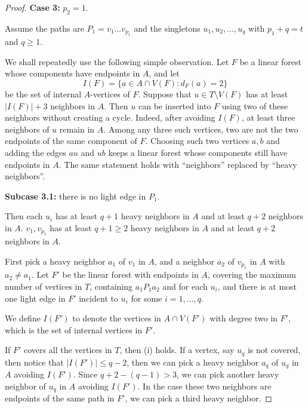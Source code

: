 \documentclass[12pt]{article}
\begin{document}
\begin{proof}
    \noindent
    \textbf{Case 3:} $p_2 = 1$.
    
    Assume the paths are $P_1=v_1 \ldots v_{p_1}$ and the singletons $u_1, u_2,\ldots, u_q$ with $p_1 + q = t$ and $q\geq 1$.

    We shall repeatedly use the following simple observation. Let $F$ be a
linear forest whose components have endpoints in $A$, and let
$$
I(F)=\{a\in A\cap V(F): d_F(a)=2\}
$$
be the set of internal $A$-vertices of $F$. Suppose that
$u\in T\setminus V(F)$ has at least $|I(F)|+3$ neighbors in $A$.
Then $u$ can be inserted into $F$ using two of these neighbors without
creating a cycle. Indeed, after avoiding $I(F)$, at least three neighbors
of $u$ remain in $A$. Among any three such vertices, two are not the two
endpoints of the same component of $F$. Choosing such two vertices $a,b$
and adding the edges $au$ and $ub$ keeps a linear forest whose components
still have endpoints in $A$. The same statement holds with ``neighbors''
replaced by ``heavy neighbors''.

    \textbf{Subcase 3.1:} there is no light edge in $P_1$.
    
    Then each $u_i$ has at least $q+1$ heavy neighbors in $A$ and at least $q+2$ neighbors in $A$.
    $v_1, v_{p_1}$ has at least $q+1\geq 2$ heavy neighbors in $A$ and at least $q+2$ neighbors in $A$.

    First pick a heavy neighbor $a_1$ of $v_1$ in $A$, and a neighbor $a_2$ of $v_{p_1}$ in $A$ with $a_2 \neq a_1$.
    Let $F'$ be the linear forest with endpoints in $A$, covering the maximum number of vertices in $T$, containing $a_1P_1a_2$ and for each $u_i$, and there is at most one light edge in $F'$ incident to $u_i$ for some $i=1,\dots,q$.
    
    We define $I(F')$ to denote the vertices in $A\cap V(F')$ with degree two in $F'$, which is the set of internal vertices in $F'$.

    
    If $F'$ covers all the vertices in $T$, then (i) holds.
    If a vertex, say $u_q$ is not covered, then notice that $|I(F')|\leq q-2$, then we can pick a heavy neighbor $a_q$ of $u_q$ in $A$ avoiding $I(F')$.
    Since $q+2-(q-1) > 3$, we can pick another heavy neighbor of $u_q$ in $A$ avoiding $I(F')$. In the case these two neighbors are endpoints of the same path in $F'$, we can pick a third heavy neighbor. 



\end{proof}
\end{document}
